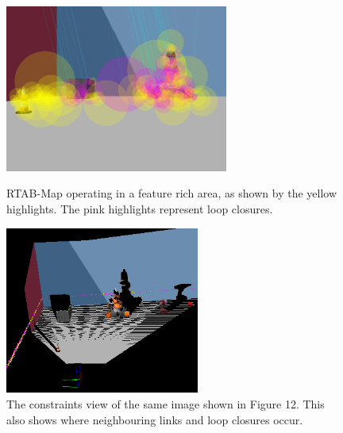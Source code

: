 \documentclass[a4paper]{article}
\begin{document}
\begin{figure}[h]
\centering
\begin{minipage}[t]{0.45\textwidth}
\centering
\includegraphics[height=5.5cm]{slam_house_features_corner_1}
\caption{RTAB-Map operating in a feature rich area, as shown by the yellow highlights. The pink highlights represent loop closures.}
\end{minipage}
\hspace{1cm}
\begin{minipage}[t]{0.45\textwidth}
\centering
\includegraphics[height=5.5cm]{slam_house_constraints_1}
\caption{The constraints view of the same image shown in Figure 12. This also shows where neighbouring links and loop closures occur.}
\end{minipage}
\end{figure}
\end{document}
